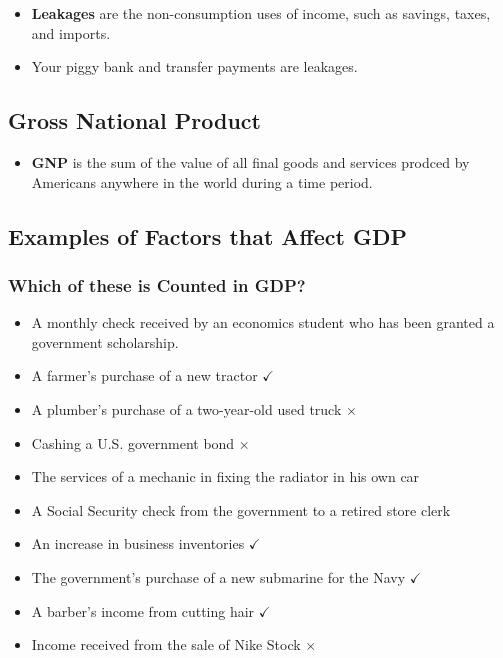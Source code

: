 \documentclass[
  letterpaper,
  DIV=11,
  numbers=noendperiod]{scrartcl}
\providecommand{\tightlist}{%
  \setlength{\itemsep}{0pt}\setlength{\parskip}{0pt}}\usepackage{longtable,booktabs,array}
\begin{document}
\begin{itemize}
\tightlist
\item
  \textbf{Leakages} are the non-consumption uses of income, such as
  savings, taxes, and imports.
\item
  Your piggy bank and transfer payments are leakages.
\end{itemize}

\subsection{Gross National Product}\label{gross-national-product}

\begin{itemize}
\tightlist
\item
  \textbf{GNP} is the sum of the value of all final goods and services
  prodced by Americans anywhere in the world during a time period.
\end{itemize}

\subsection{Examples of Factors that Affect
GDP}\label{examples-of-factors-that-affect-gdp}

\subsubsection{Which of these is Counted in
GDP?}\label{which-of-these-is-counted-in-gdp}

\begin{itemize}
\tightlist
\item
  A monthly check received by an economics student who has been granted
  a government scholarship.
\item
  A farmer's purchase of a new tractor \(\checkmark\)
\item
  A plumber's purchase of a two-year-old used truck \(\times\)
\item
  Cashing a U.S. government bond \(\times\)
\item
  The services of a mechanic in fixing the radiator in his own car
\item
  A Social Security check from the government to a retired store clerk
\item
  An increase in business inventories \(\checkmark\)
\item
  The government's purchase of a new submarine for the Navy
  \(\checkmark\)
\item
  A barber's income from cutting hair \(\checkmark\)
\item
  Income received from the sale of Nike Stock \(\times\)
\end{itemize}
\end{document}
